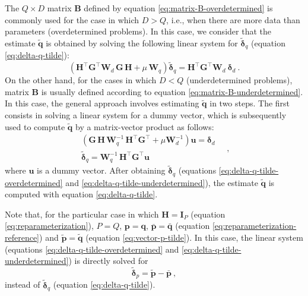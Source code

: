 The $Q \times D$ matrix $\mathbf{B}$ defined by equation \ref{eq:matrix-B-overdetermined} is commonly used for the case 
in which $D > Q$, i.e., when there are more data than parameters (overdetermined problems).
In this case, we consider that the estimate $\tilde{\mathbf{q}}$ is obtained by solving the following linear system
for $\tilde{\boldsymbol{\delta}}_{q}$ (equation \ref{eq:delta-q-tilde}):
\begin{equation}
	\left( \mathbf{H}^{\top} \mathbf{G}^{\top} \mathbf{W}_{d} \, \mathbf{G} \, \mathbf{H} + 
	\mu \, \mathbf{W}_{q} \right) 
	\tilde{\boldsymbol{\delta}}_{q} = 
	\mathbf{H}^{\top} \mathbf{G}^{\top} \mathbf{W}_{d} \: 
	\boldsymbol{\delta}_{d} \: .
	\label{eq:delta-q-tilde-overdetermined}
\end{equation}
On the other hand, for the cases in which $D < Q$ (underdetermined problems), matrix $\mathbf{B}$ is 
usually defined according to equation \ref{eq:matrix-B-underdetermined}. In this case, the general approach involves 
estimating $\tilde{\mathbf{q}}$ in two steps. The first consists in solving a linear system 
for a dummy vector, which is subsequently used to compute $\tilde{\mathbf{q}}$ by a matrix-vector product as follows:
\begin{equation}
	\begin{split}
		\left( \mathbf{G} \, \mathbf{H} \, \mathbf{W}_{q}^{-1} \,
		\mathbf{H}^{\top}\mathbf{G}^{\top} + \mu \mathbf{W}_{d}^{-1} \right)  
		\mathbf{u} = \boldsymbol{\delta}_{d} \\
		\tilde{\boldsymbol{\delta}}_{q} = \mathbf{W}_{q}^{-1} \, \mathbf{H}^{\top} \mathbf{G}^{\top} \mathbf{u}
	\end{split} \quad ,
	\label{eq:delta-q-tilde-underdetermined}
\end{equation}
where $\mathbf{u}$ is a dummy vector.
After obtaining $\tilde{\boldsymbol{\delta}}_{q}$ (equations \ref{eq:delta-q-tilde-overdetermined} and \ref{eq:delta-q-tilde-underdetermined}),
the estimate $\tilde{\mathbf{q}}$ is computed with equation \ref{eq:delta-q-tilde}.

Note that, for the particular case in which $\mathbf{H} = \mathbf{I}_{P}$ (equation \ref{eq:reparameterization}), 
$P = Q$, $\mathbf{p} = \mathbf{q}$, $\bar{\mathbf{p}} = \bar{\mathbf{q}}$ (equation \ref{eq:reparameterization-reference}) and 
$\tilde{\mathbf{p}} = \tilde{\mathbf{q}}$ (equation \ref{eq:vector-p-tilde}).
In this case, the linear system (equations \ref{eq:delta-q-tilde-overdetermined} and \ref{eq:delta-q-tilde-underdetermined}) is directly 
solved for 
\begin{equation}
	\tilde{\boldsymbol{\delta}}_{p} = \tilde{\mathbf{p}} - \bar{\mathbf{p}} \: ,
	\label{eq:delta-p-tilde}
\end{equation}
instead of $\tilde{\boldsymbol{\delta}}_{q}$ (equation \ref{eq:delta-q-tilde}).


